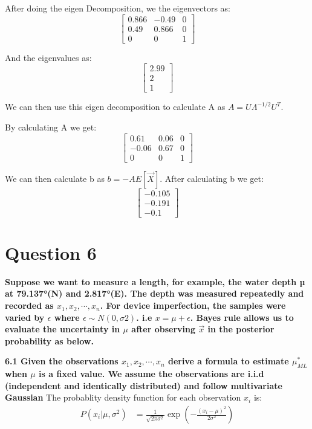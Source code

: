 \documentclass{article}
\begin{document}
After doing the eigen Decomposition, we the eigenvectors as:
$$
\begin{bmatrix}
    0.866 & -0.49 & 0 \\
    0.49 & 0.866 & 0 \\
    0 & 0 & 1
\end{bmatrix}
$$

And the eigenvalues as:
$$
\begin{bmatrix}
    2.99 \\
    2 \\
    1
\end{bmatrix}
$$

We can then use this eigen decomposition to calculate A as $A = U \Lambda^{-1/2} U^T$.

By calculating A we get:
$$
\begin{bmatrix}
    0.61 & 0.06 & 0 \\
    -0.06 & 0.67 & 0 \\
    0 & 0 & 1
\end{bmatrix}
$$

We can then calculate b as $b = -A E[\vec{X}]$.
After calculating b we get:
$$
\begin{bmatrix}
    -0.105\\
    -0.191\\
    -0.1
\end{bmatrix}
$$

\section*{Question 6}
\noindent \textbf{Suppose we want to measure a length, for example,
the water depth µ at 79.137°(N) and 2.817°(E). The depth was measured repeatedly and recorded
as $x_1, x_2, \cdots, x_n$. For device imperfection, the samples were varied by $\epsilon$ where $\epsilon \sim N (0, \sigma2)$. i.e $x = \mu+\epsilon$.
Bayes rule allows us to evaluate the uncertainty in $\mu$ after observing $\vec{x}$ in the posterior probability as below.}

\bigbreak

\noindent \textbf{6.1 Given the observations $x_1, x_2, \cdots, x_n$ derive a formula to estimate $\mu^*_{ML}$ when $\mu$ is a fixed value. We
assume the observations are i.i.d (independent and identically distributed) and follow multivariate Gaussian} \newline
The probablity density function for each observation $x_i$ is:
\begin{align*}
    P(x_i|\mu, \sigma^2) &= \frac{1}{\sqrt{2\pi\sigma^2}} \exp\left(-\frac{(x_i - \mu)^2}{2\sigma^2}\right)
\end{align*}
\end{document}
